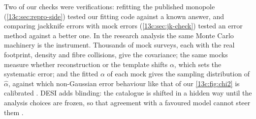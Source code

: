 \begin{inpractice}
Two of our checks were verifications: refitting the published monopole
(\cref{13c:sec:repro-side}) tested our fitting code against a known answer, and
comparing jackknife errors with mock errors (\cref{13c:sec:jk-check}) tested an error
method against a better one. In the research analysis the same Monte Carlo machinery is
the instrument. Thousands of mock surveys, each with the real footprint, density and
fibre collisions, give the covariance; the same mocks measure whether reconstruction
or the template shifts $\alpha$, which sets the systematic error; and the fitted
$\alpha$ of each mock gives the sampling distribution of $\hat\alpha$, against which
non-Gaussian error behaviour like that of our \cref{13c:fig:chi2} is calibrated
\cite{Cuesta2016,Alam2017}. DESI adds blinding: the catalogue is shifted in a hidden way
until the analysis choices are frozen, so that agreement with a favoured model cannot
steer them .
\end{inpractice}


